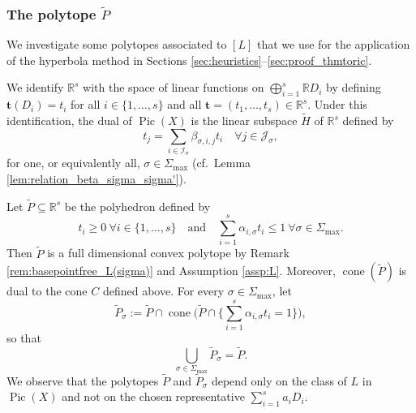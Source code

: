\documentclass[11pt]{article}
\numberwithin{equation}{section}
\newcommand{\bft}{\boldsymbol{t}}
\newcommand\RR{\mathbb{R}}
\newcommand{\ii}[1]{\mathcal{J}_{#1}}
\newcommand{\ic}[1]{\mathcal{I}_{#1}}
\DeclareMathOperator{\cone}{cone}
\DeclareMathOperator{\pic}{Pic}
\theoremstyle{definition}
\numberwithin{theorem}{section}
\begin{document}
\subsubsection{The polytope $\widetilde P$}
We investigate some polytopes associated to $[L]$ that we use for
the application of the hyperbola method
in Sections \ref{sec:heuristics}--\ref{sec:proof_thmtoric}.

We identify $\RR^{s}$ with the space of linear functions on
$\bigoplus_{i=1}^s\RR D_i$ by defining
\hbox{$\bft (D_i)\!=\!t_i$} for all $i\in\{1,\dots,s\}$ and all $\bft=(t_1,\dots,t_s)\in\RR^s$.
Under this identification, the dual of $\pic(X)$ is
the linear subspace $\widetilde H$ of $\RR^{ s }$ defined by
\begin{equation}
\label{eq:dual_picard}
t_{j}
=\sum_{i\in\ic{\sigma}} \beta_{\sigma, i,j}t_i
\quad \forall j\in \ii{\sigma},
\end{equation}
for one, or equivalently all, $\sigma\in\Sigma_{\max}$
(cf.~Lemma \ref{lem:relation_beta_sigma_sigma'}).

Let $\widetilde P \subseteq \RR^{s}$ be the polyhedron
defined by
\begin{equation}
\label{eq:widetildeP}
t_i\geq0 \ \forall i\in\{1,\dots,s\} \quad \text{and} \quad
\sum_{i=1}^s\alpha_{i,\sigma} t_i\leq 1 \
\forall \sigma\in \Sigma_{\max}.
\end{equation}
Then $\widetilde P$ is a full dimensional convex polytope by
Remark \ref{rem:basepointfree_L(sigma)} and Assumption \ref{assp:L}.
Moreover, $\cone(\widetilde P)$ is dual to the cone
$C$ defined above.
For every $\sigma\in\Sigma_{\max}$, let \[
\widetilde P_\sigma:=\widetilde P \cap
\cone \biggl (
\widetilde P\cap \biggl \{
\sum_{i=1}^s\alpha_{i,\sigma} t_i =1
\biggr \} \biggr),
\]
so that
\begin{equation}
\label{eq:widetildeP_union}
\bigcup_{\sigma \in \Sigma_{\max}}\widetilde P_\sigma=\widetilde P.
\end{equation}
We observe that the polytopes $\widetilde P$ and $\widetilde P_\sigma$ depend only
on the class of $L$ in $\pic(X)$ and not on the chosen representative $\sum_{i=1}^s a_i D_i$.
\end{document}
